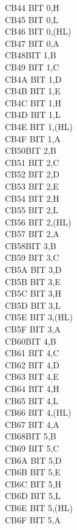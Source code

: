 \documentclass[twoside,openright,a4paper]{book}
\begin{document}
\begin{multicols}{3}
{\begin{tabbing}
	CB44\> 	BIT 0,H\\
	CB45\> 	BIT 0,L\\
	CB46\> 	BIT 0,(HL)\\
	CB47\> 	BIT 0,A\\
	CB48\>BIT 1,B\\
	CB49\> 	BIT 1,C\\
	CB4A\> 	BIT 1,D\\
	CB4B\> 	BIT 1,E\\
	CB4C\> 	BIT 1,H\\
	CB4D\> 	BIT 1,L\\
	CB4E\> 	BIT 1,(HL)\\
	CB4F\> 	BIT 1,A\\
	CB50\>BIT 2,B\\
	CB51\> 	BIT 2,C\\
	CB52\> 	BIT 2,D\\
	CB53\> 	BIT 2,E\\
	CB54\> 	BIT 2,H\\
	CB55\> 	BIT 2,L\\
	CB56\> 	BIT 2,(HL)\\
	CB57\> 	BIT 2,A\\
	CB58\>BIT 3,B\\
	CB59\> 	BIT 3,C\\
	CB5A\> 	BIT 3,D\\
	CB5B\> 	BIT 3,E\\
	CB5C\> 	BIT 3,H\\
	CB5D\> 	BIT 3,L\\
	CB5E\> 	BIT 3,(HL)\\
	CB5F\> 	BIT 3,A\\
	CB60\>BIT 4,B\\
	CB61\> 	BIT 4,C\\
	CB62\> 	BIT 4,D\\
	CB63\> 	BIT 4,E\\
	CB64\> 	BIT 4,H\\
	CB65\> 	BIT 4,L\\
	CB66\> 	BIT 4,(HL)\\
	CB67\> 	BIT 4,A\\
	CB68\>BIT 5,B\\
	CB69\> 	BIT 5,C\\
	CB6A\> 	BIT 5,D\\
	CB6B\> 	BIT 5,E\\
	CB6C\> 	BIT 5,H\\
	CB6D\> 	BIT 5,L\\
	CB6E\> 	BIT 5,(HL)\\
	CB6F\> 	BIT 5,A\\

\end{tabbing}}
\end{multicols}
\end{document}
